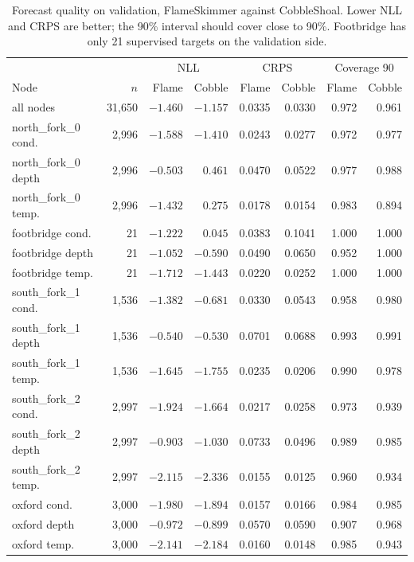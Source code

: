\documentclass{article}
\begin{document}
\begin{table}[t]
  \centering
  \caption{Forecast quality on validation, FlameSkimmer against CobbleShoal.
    Lower NLL and CRPS are better; the 90\% interval should cover close to
    90\%. Footbridge has only 21 supervised targets on the validation side.}
  \label{tab:quality}
  \begin{tabular}{lrrrrrrr}
    \toprule
     & & \multicolumn{2}{c}{NLL} & \multicolumn{2}{c}{CRPS} & \multicolumn{2}{c}{Coverage 90} \\
    Node & $n$ & Flame & Cobble & Flame & Cobble & Flame & Cobble \\
    \midrule
    all nodes                 & 31{,}650 & $-1.460$ & $-1.157$ & 0.0335 & 0.0330 & 0.972 & 0.961 \\
    \midrule
    north\_fork\_0 cond.      & 2{,}996 & $-1.588$ & $-1.410$ & 0.0243 & 0.0277 & 0.972 & 0.977 \\
    north\_fork\_0 depth      & 2{,}996 & $-0.503$ &  $0.461$ & 0.0470 & 0.0522 & 0.977 & 0.988 \\
    north\_fork\_0 temp.      & 2{,}996 & $-1.432$ &  $0.275$ & 0.0178 & 0.0154 & 0.983 & 0.894 \\
    footbridge cond.          &      21 & $-1.222$ &  $0.045$ & 0.0383 & 0.1041 & 1.000 & 1.000 \\
    footbridge depth          &      21 & $-1.052$ & $-0.590$ & 0.0490 & 0.0650 & 0.952 & 1.000 \\
    footbridge temp.          &      21 & $-1.712$ & $-1.443$ & 0.0220 & 0.0252 & 1.000 & 1.000 \\
    south\_fork\_1 cond.      & 1{,}536 & $-1.382$ & $-0.681$ & 0.0330 & 0.0543 & 0.958 & 0.980 \\
    south\_fork\_1 depth      & 1{,}536 & $-0.540$ & $-0.530$ & 0.0701 & 0.0688 & 0.993 & 0.991 \\
    south\_fork\_1 temp.      & 1{,}536 & $-1.645$ & $-1.755$ & 0.0235 & 0.0206 & 0.990 & 0.978 \\
    south\_fork\_2 cond.      & 2{,}997 & $-1.924$ & $-1.664$ & 0.0217 & 0.0258 & 0.973 & 0.939 \\
    south\_fork\_2 depth      & 2{,}997 & $-0.903$ & $-1.030$ & 0.0733 & 0.0496 & 0.989 & 0.985 \\
    south\_fork\_2 temp.      & 2{,}997 & $-2.115$ & $-2.336$ & 0.0155 & 0.0125 & 0.960 & 0.934 \\
    oxford cond.              & 3{,}000 & $-1.980$ & $-1.894$ & 0.0157 & 0.0166 & 0.984 & 0.985 \\
    oxford depth              & 3{,}000 & $-0.972$ & $-0.899$ & 0.0570 & 0.0590 & 0.907 & 0.968 \\
    oxford temp.              & 3{,}000 & $-2.141$ & $-2.184$ & 0.0160 & 0.0148 & 0.985 & 0.943 \\
    \bottomrule
  \end{tabular}
\end{table}
\end{document}
